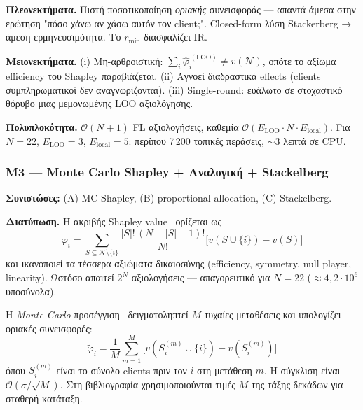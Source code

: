 \textbf{Πλεονεκτήματα.} Πιστή ποσοτικοποίηση \emph{οριακής} συνεισφοράς — απαντά άμεσα στην ερώτηση
"πόσο χάνω αν χάσω αυτόν τον client;". Closed-form λύση Stackerberg → άμεση ερμηνευσιμότητα. Το
$r_{\min}$ διασφαλίζει IR.

\textbf{Μειονεκτήματα.} (i) Μη-αρθροιστική: $\sum_i \hat{\varphi}_i^{\,(\text{LOO})} \neq v(\mathcal N)$,
οπότε το αξίωμα efficiency του Shapley παραβιάζεται. (ii) Αγνοεί διαδραστικά effects (clients
συμπληρωματικοί δεν αναγνωρίζονται). (iii) Single-round: ευάλωτο σε στοχαστικό θόρυβο μιας μεμονωμένης
LOO αξιολόγησης.

\textbf{Πολυπλοκότητα.} $\mathcal{O}(N+1)$ FL αξιολογήσεις, καθεμία $\mathcal{O}(E_{\text{LOO}} \cdot N
\cdot E_{\text{local}})$. Για $N=22$, $E_{\text{LOO}}=3$, $E_{\text{local}}=5$: περίπου 7\,200 τοπικές
περάσεις, $\sim$3 λεπτά σε CPU.

\subsubsection{M3 — Monte Carlo Shapley + Αναλογική + Stackelberg}
\label{subsubsec:M3_shapley_stackelberg}

\textbf{Συνιστώσες:} (A) MC Shapley, (B) proportional allocation, (C) Stackelberg.

\textbf{Διατύπωση.} Η ακριβής Shapley value~\cite{Shapley1953} ορίζεται ως
\begin{equation}
    \varphi_i = \sum_{S \subseteq \mathcal N \setminus \{i\}}
                \frac{|S|!\,(N-|S|-1)!}{N!} \big[v(S \cup \{i\}) - v(S)\big]
    \label{eq:shapley_exact}
\end{equation}
και ικανοποιεί τα τέσσερα αξιώματα δικαιοσύνης (efficiency, symmetry, null player, linearity). Ωστόσο
απαιτεί $2^N$ αξιολογήσεις — απαγορευτικό για $N=22$ ($\approx 4{,}2 \cdot 10^6$ υποσύνολα).

Η \emph{Monte Carlo} προσέγγιση~\cite{Jia2020} δειγματοληπτεί $M$ τυχαίες μεταθέσεις και υπολογίζει
οριακές συνεισφορές:
\begin{equation}
    \tilde{\varphi}_i = \frac{1}{M} \sum_{m=1}^{M} \big[v(S_i^{(m)} \cup \{i\}) - v(S_i^{(m)})\big]
    \label{eq:M3_mcshapley}
\end{equation}
όπου $S_i^{(m)}$ είναι το σύνολο clients πριν τον $i$ στη μετάθεση $m$. Η σύγκλιση είναι
$\mathcal{O}(\sigma / \sqrt{M})$. Στη βιβλιογραφία χρησιμοποιούνται τιμές $M$ της τάξης δεκάδων για σταθερή κατάταξη.

